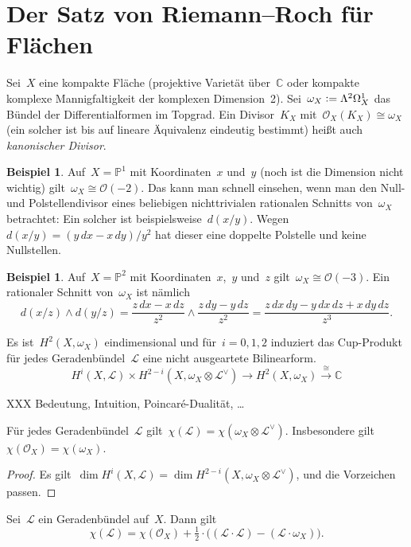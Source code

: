 \documentclass[a4paper,ngerman,12pt]{scrartcl}
\theoremstyle{definition}
\newtheorem{ex}[defn]{Beispiel}
\theoremstyle{plain}
\theoremstyle{remark}
\newcommand{\CC}{\mathbb{C}}
\newcommand{\PP}{\mathbb{P}}
\renewcommand{\L}{\mathcal{L}}
\renewcommand{\O}{\mathcal{O}}
\newcommand{\lra}{\longrightarrow}
\newcommand{\defeq}{\vcentcolon=}
\begin{document}
\section{Der Satz von Riemann--Roch für Flächen}

Sei~$X$ eine kompakte Fläche (projektive Varietät über~$\CC$ oder kompakte
komplexe Mannigfaltigkeit der komplexen Dimension~2). Sei~$\omega_X \defeq
\Lambda^2 \Omega^1_X$ das Bündel der Differentialformen im Topgrad. Ein
Divisor~$K_X$ mit~$\O_X(K_X) \cong \omega_X$ (ein solcher ist bis auf lineare
Äquivalenz eindeutig bestimmt) heißt auch \emph{kanonischer Divisor}.

\begin{ex}Auf~$X = \PP^1$ mit Koordinaten~$x$ und~$y$ (noch ist die Dimension
nicht wichtig) gilt~$\omega_X \cong \O(-2)$. Das kann man schnell einsehen,
wenn man den Null- und Polstellendivisor eines beliebigen nichttrivialen
rationalen Schnitts von~$\omega_X$ betrachtet: Ein solcher ist
beispielsweise~$d(x/y)$. Wegen~$d(x/y) = (y\,dx-x\,dy)/y^2$ hat dieser eine
doppelte Polstelle und keine Nullstellen.\end{ex}

\begin{ex}Auf~$X = \PP^2$ mit Koordinaten~$x$,~$y$ und~$z$ gilt~$\omega_X \cong
\O(-3)$. Ein rationaler Schnitt von~$\omega_X$ ist nämlich
\[ d(x/z) \wedge d(y/z) =
  \frac{z\,dx - x\,dz}{z^2} \wedge \frac{z\,dy - y\,dz}{z^2} =
  \frac{z\,dx\,dy - y\,dx\,dz + x\,dy\,dz}{z^3}. \]\end{ex}

\begin{fact}Es ist~$H^2(X,\omega_X)$ eindimensional und
für~$i = 0,1,2$ induziert das Cup-Produkt für jedes Geradenbündel~$\L$ eine
nicht ausgeartete Bilinearform.
\[ H^i(X,\L) \times H^{2-i}(X,\omega_X \otimes \L^\vee) \lra
  H^2(X,\omega_X) \stackrel{\cong}{\lra} \CC \]
\end{fact}

XXX Bedeutung, Intuition, Poincaré-Dualität, \ldots

\begin{cor}Für jedes Geradenbündel~$\L$ gilt~$\chi(\L) = \chi(\omega_X \otimes
\L^\vee)$. Insbesondere gilt~$\chi(\O_X) = \chi(\omega_X)$.\end{cor}
\begin{proof}Es gilt~$\dim H^i(X,\L) = \dim H^{2-i}(X,\omega_X \otimes \L^\vee)$,
und die Vorzeichen passen.
\end{proof}

\begin{thm}
Sei~$\L$ ein Geradenbündel auf~$X$. Dann gilt
\[ \chi(\L) = \chi(\O_X) + \tfrac{1}{2} \cdot \bigl((\L \cdot \L) - (\L \cdot \omega_X)\bigr). \]
\end{thm}
\end{document}
